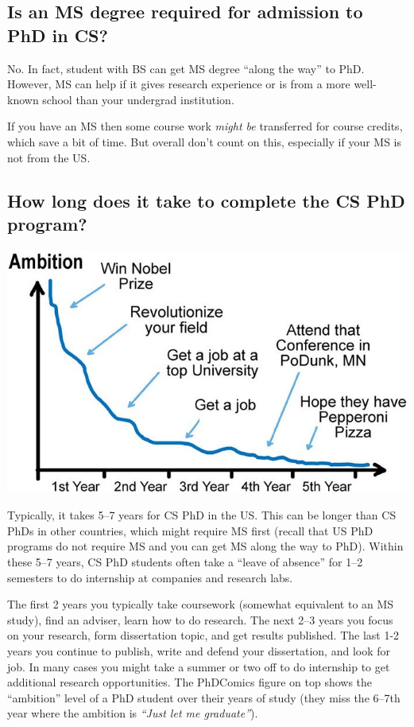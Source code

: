 \documentclass[11pt]{article}
\newenvironment{commentbox}[1][]{
\small
    \begin{cbox}
    \textbf{#1} 
 }{
   \end{cbox}
}
\begin{document}
\subsection{Is an MS degree required for admission to PhD in CS?}\label{sec:msrequirement}
No. In fact, student with BS can get MS degree ``along the way'' to PhD.  However, MS can help if it gives research experience or is from a more well-known school than your undergrad institution. 

If you have an MS then some course work \emph{might be} transferred for course credits, which save a bit of time. But overall don't count on this, especially if your MS is not from the US. 


\subsection{How long does it take to complete the CS PhD program?}\label{sec:time}


\begin{center}
\includegraphics[scale=0.3]{c4a.png}
\end{center}


    Typically, it takes 5--7 years for CS PhD in the US.  This can be longer than CS PhDs in other countries, which might require MS first (recall that US PhD programs do not require MS and you can get MS along the way to PhD). Within these 5--7 years, CS PhD students often take a ``leave of absence'' for 1--2 semesters to do internship at companies and research labs. 
    
    The first 2 years you typically take coursework (somewhat equivalent to an MS study), find an adviser, learn how to do research.  The next 2--3 years you focus on your research, form dissertation topic, and get results published. The last 1-2 years you continue to publish, write and defend your dissertation, and look for job. 
    In many cases you might take a summer or two off to do internship to get additional research opportunities.
    The PhDComics figure on top shows the ``ambition'' level of a PhD student over their years of study (they miss the 6--7th year where the ambition is \emph{``Just let me graduate''}).
\end{document}
